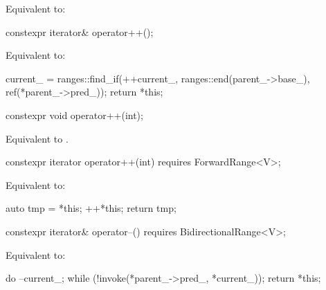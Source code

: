 \begin{itemdescr}
\pnum
\effects
Equivalent to: 
\end{itemdescr}

%
\begin{itemdecl}
constexpr iterator& operator++();
\end{itemdecl}

\begin{itemdescr}
\pnum
\effects Equivalent to:
\begin{codeblock}
current_ = ranges::find_if(++current_, ranges::end(parent_->base_), ref(*parent_->pred_));
return *this;
\end{codeblock}
\end{itemdescr}

%
\begin{itemdecl}
constexpr void operator++(int);
\end{itemdecl}

\begin{itemdescr}
\pnum
\effects Equivalent to .
\end{itemdescr}

%
\begin{itemdecl}
constexpr iterator operator++(int) requires ForwardRange<V>;
\end{itemdecl}

\begin{itemdescr}
\pnum
\effects Equivalent to:
\begin{codeblock}
auto tmp = *this;
++*this;
return tmp;
\end{codeblock}
\end{itemdescr}

%
\begin{itemdecl}
constexpr iterator& operator--() requires BidirectionalRange<V>;
\end{itemdecl}

\begin{itemdescr}
\pnum
\effects Equivalent to:
\begin{codeblock}
do
  --current_;
while (!invoke(*parent_->pred_, *current_));
return *this;
\end{codeblock}
\end{itemdescr}

